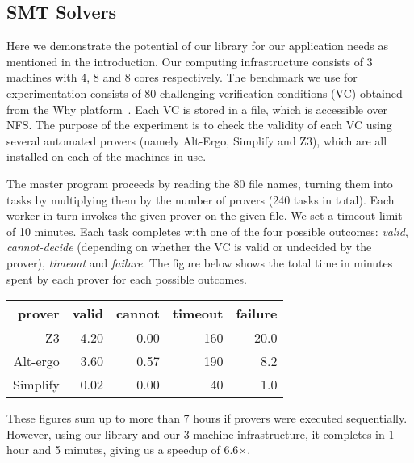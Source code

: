 \documentclass[preprint]{sigplanconf}
\begin{document}
\subsection{SMT Solvers}

Here we demonstrate the potential of our library for our application
needs as mentioned in the introduction. Our computing
infrastructure consists of 3 machines with 4, 8 and 8 cores
respectively. The benchmark we use for
experimentation consists of 80 challenging verification conditions
(VC) obtained from the Why platform~\cite{filliatre07cav}.  Each
VC is stored in a file, which is accessible over
NFS. The purpose of the experiment is to check the validity of each VC
using several automated provers (namely Alt-Ergo, Simplify and Z3),
which are all installed on each of the machines in use.

The master program proceeds by reading the 80 file names, turning them
into tasks by multiplying them by the number of provers (240 tasks in total).
Each worker in turn invokes the given prover on the given file.
We set a timeout limit of 10 minutes.
Each task completes with one of the four possible outcomes: \emph{valid},
\emph{cannot-decide} (depending on
whether the VC is valid or undecided by the prover), 
\emph{timeout} and \emph{failure}.
The figure below shows the total time in minutes spent by each prover
for each possible outcomes.
\begin{center}
  \begin{tabular}{|r|r|r|r|r|}
    \hline
    prover   & valid & cannot & timeout & failure
    \\\hline\hline
    Z3       &   4.20 &   0.00 &    160  &  20.0    
    \\\hline
    Alt-ergo &   3.60 &   0.57 &    190  &   8.2     
    \\\hline
    Simplify &   0.02 &   0.00 &     40  &   1.0   
    \\\hline
  \end{tabular}
\end{center}
These figures sum up to more than 7 hours if provers were executed
sequentially. However, using our library and our 3-machine
infrastructure, it completes in 1 hour and 5 minutes, giving us a
speedup of 6.6$\times$.

\end{document}
